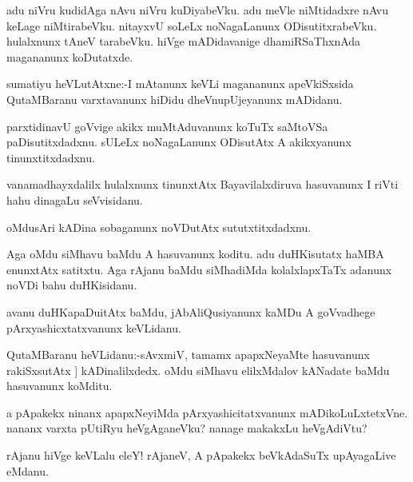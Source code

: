 \documentclass{article}
\begin{document}
\begin{mn}%
adu niVru kudidAga nAvu niVru kuDiyabeVku. adu meVle niMtidadxre nAvu keLage niMtirabeVku. 
nitayxvU soLeLx noNagaLanunx ODisutitxrabeVku. hulalxnunx tAneV tarabeVku. hiVge 
mADidavanige dhamiRSaThxnAda magananunx koDutatxde.
\end{mn}

\begin{mn}%
sumatiyu heVLutAtxne:-I mAtanunx keVLi magananunx apeVkiSxsida QutaMBaranu varxtavanunx 
hiDidu dheVnupUjeyanunx mADidanu.
\end{mn}

\begin{mn}%
parxtidinavU goVvige akikx muMtAduvanunx koTuTx saMtoVSa paDisutitxdadxnu. sULeLx 
noNagaLanunx ODisutAtx A akikxyanunx tinunxtitxdadxnu.
\end{mn}

\begin{mn}%
vanamadhayxdalilx hulalxnunx tinunxtAtx Bayavilalxdiruva hasuvanunx I riVti hahu dinagaLu 
seVvisidanu.
\end{mn}

\begin{mn}%
oMdusAri kADina sobaganunx noVDutAtx sututxtitxdadxnu. 
\end{mn}

\begin{mn}%
Aga oMdu siMhavu baMdu A hasuvanunx koditu. adu duHKisutatx haMBA enunxtAtx satitxtu. Aga 
rAjanu baMdu siMhadiMda kolalxlapxTaTx adanunx noVDi bahu duHKisidanu.
\end{mn}

\begin{mn}%
avanu duHKapaDuitAtx baMdu, jAbAliQusiyanunx kaMDu A goVvadhege pArxyashicxtatxvanunx 
keVLidanu.
\end{mn}

\begin{mn}%
QutaMBaranu heVLidanu:-sAvxmiV, tamamx apapxNeyaMte hasuvanunx rakiSxsutAtx ]
kADinalilxdedx. oMdu siMhavu elilxMdalov kANadate baMdu hasuvanunx koMditu.
\end{mn}

\begin{mn}%
a pApakekx ninanx apapxNeyiMda pArxyashicitatxvanunx mADikoLuLxtetxVne. nananx varxta 
pUtiRyu heVgAganeVku? nanage makakxLu heVgAdiVtu?
\end{mn}

\begin{mn}%
rAjanu hiVge keVLalu eleY! rAjaneV, A pApakekx beVkAdaSuTx upAyagaLive eMdanu.
\end{mn}
\end{document}
